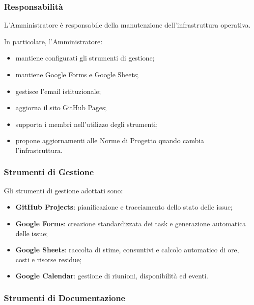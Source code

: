 
\subsubsection{Responsabilità}

L'Amministratore è responsabile della manutenzione dell'infrastruttura operativa.

In particolare, l'Amministratore:

\begin{itemize}
    \item mantiene configurati gli strumenti di gestione;
    \item mantiene Google Forms e Google Sheets;
    \item gestisce l'email istituzionale;
    \item aggiorna il sito GitHub Pages;
    \item supporta i membri nell'utilizzo degli strumenti;
    \item propone aggiornamenti alle Norme di Progetto quando cambia l'infrastruttura.
\end{itemize}


\subsubsection{Strumenti di Gestione}

Gli strumenti di gestione adottati sono:

\begin{itemize}
    \item \textbf{GitHub Projects}: pianificazione e tracciamento dello stato delle
    issue;

    \item \textbf{Google Forms}: creazione standardizzata dei task e generazione
    automatica delle issue;

    \item \textbf{Google Sheets}: raccolta di stime, consuntivi e calcolo automatico
    di ore, costi e risorse residue;

    \item \textbf{Google Calendar}: gestione di riunioni, disponibilità ed eventi.
\end{itemize}


\subsubsection{Strumenti di Documentazione}

